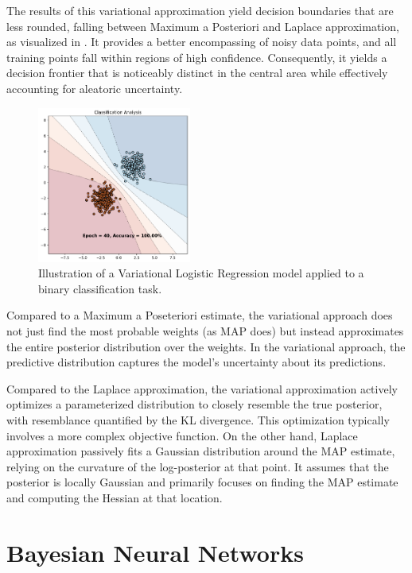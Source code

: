 The results of this variational approximation yield decision boundaries that are less rounded, falling between Maximum a Posteriori and Laplace approximation, as visualized in . It provides a better encompassing of noisy data points, and all training points fall within regions of high confidence. Consequently, it yields a decision frontier that is noticeably distinct in the central area while effectively accounting for aleatoric uncertainty.

\begin{figure}[H]
    \centering
    \includegraphics[width=0.45\textwidth]{logreg_variational.pdf}
    \caption{Illustration of a Variational Logistic Regression model applied to a binary classification task.}
    \label{fig:logreg_variational}
\end{figure}

Compared to a Maximum a Poseteriori estimate, the variational approach does not just find the most probable weights (as MAP does) but instead approximates the entire posterior distribution over the weights. In the variational approach, the predictive distribution captures the model's uncertainty about its predictions.

Compared to the Laplace approximation, the variational approximation actively optimizes a parameterized distribution to closely resemble the true posterior, with resemblance quantified by the KL divergence. This optimization typically involves a more complex objective function. On the other hand, Laplace approximation passively fits a Gaussian distribution around the MAP estimate, relying on the curvature of the log-posterior at that point. It assumes that the posterior is locally Gaussian and primarily focuses on finding the MAP estimate and computing the Hessian at that location.

\section{Bayesian Neural Networks}
